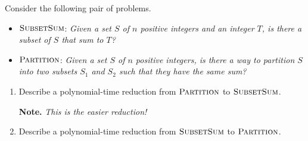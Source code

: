 \documentclass{article}
\begin{document}
\begin{question}
Consider the following pair of problems.

\begin{itemize}
    \item $\mathsf{\textsc{SubsetSum}}$: {\em Given a set $S$ of $n$ positive integers and an integer $T$, is there a subset of $S$ that sum to $T$?}
    \item $\mathsf{\textsc{Partition}}$: {\em Given a set $S$ of $n$ positive integers, is there a way to partition $S$ into two subsets $S_1$ and $S_2$ such that they have the same sum?}
\end{itemize}

\begin{enumerate}[label = (\alph*)]

    \item Describe a polynomial-time reduction from $\mathsf{\textsc{Partition}}$ to $\mathsf{\textsc{SubsetSum}}$.

    {\bfseries Note.} {\em This is the easier reduction!}
    
    \item Describe a polynomial-time reduction from $\mathsf{\textsc{SubsetSum}}$ to $\mathsf{\textsc{Partition}}$.
\end{enumerate}
\end{question}
\end{document}
